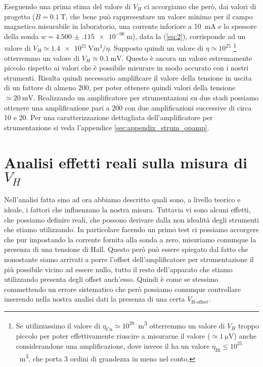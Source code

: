 \documentclass[
    prl,
    reprint, 
    superscriptaddress, 
    altaffilletter, 
    amsmath, 
    amssymb, 
    a4paper,
    varvw]{revtex4-2}
\begin{document}
Eseguendo una prima stima del valore di $V_H$ ci accorgiamo che però, dai valori di progetto ($B=\SI{0.1}{\tesla}$, che bene può rappresentare un valore minimo per il campo magnetico misurabile in laboratorio, una corrente inforiore a \SI{10}{\milli\ampere} e lo spessore della sonda $w=\SI{4.500(115)e-06}{\metre}$), data la (\ref{eq:2}), corrisponde ad un valore di $V_H \simeq\SI[exponent-mode = scientific]{1.4e21}{\volt\cubic\metre}/\eta$. Supposto quindi un valore di $\eta\simeq10^{25}$ \footnote{Se utilizzassimo il valore di $\eta_\text{Cu}\simeq10^{28}$\si{\per\cubic\metre} otterremmo un valore di $V_H$ troppo piccolo per poter effettivamente riuscire a misurarne il valore ($\simeq\SI{1}{\micro\volt}$) anche considerandone una amplificazione, dove invece il  ha un valore $\eta_\text{Bi}\leq10^{25}$ \si{\per\cubic\metre}, che porta 3 ordini di grandezza in meno nel conto.} otterremmo un valore di $V_H\simeq\SI{0.1}{\milli\volt}$. Questo è ancora un valore estremamente piccolo rispetto ai valori che è possibile misurare in modo accurato con i nostri strumenti. Risulta quindi necessario amplificare il valore della tensione in uscita di un fattore di almeno 200, per poter ottenere quindi valori della tensione $\simeq\SI{20}{\milli\volt}$. Realizzando un amplificatore per strumentazioni su due stadi possiamo ottenere una amplificazione pari a 200 con due amplificazioni successive di circa 10 e 20. Per una caratterizzazione dettagliata dell'amplificatore per strumentazione si veda l'appendice \ref{sec:appendix_strum_opamp}.

\section{Analisi effetti reali sulla misura di $V_H$}
Nell'analisi fatta sino ad ora abbiamo descritto quali sono, a livello teorico e ideale, i fattori che influenzano la nostra misura. Tuttavia vi sono alcuni effetti, che possiamo definire reali, che possono derivare dalla non idealità degli strumenti che stiamo utilizzando. In particolare facendo un primo test ci possiamo accorgere che pur impostando la corrente fornita alla sonda a zero, misuriamo comunque la presenza di una tensione di Hall. Questo però può essere spiegato dal fatto che nonostante siamo arrivati a porre l'offset dell'amplificatore per strumentazione il più possibile vicino ad essere nullo, tutto il resto dell'apparato che stiamo utilizzando presenta degli offset anch'esso. Quindi è come se stessimo commettendo un errore sistematico che però possiamo comunque controllare inserendo nella nostra analisi dati la presenza di una certa $V_\text{H-offset}$. 
\end{document}
